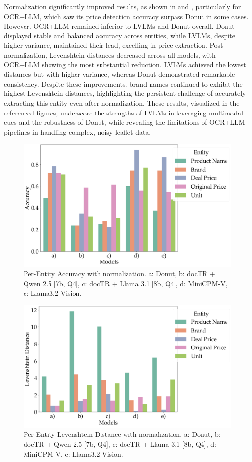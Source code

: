 \documentclass[11pt]{article}
\begin{document}
Normalization significantly improved results, as shown in  and , particularly for OCR+LLM, which saw its price detection accuracy surpass Donut in some cases. However, OCR+LLM remained inferior to LVLMs and Donut overall. Donut displayed stable and balanced accuracy across entities, while LVLMs, despite higher variance, maintained their lead, excelling in price extraction. Post-normalization, Levenshtein distances decreased across all models, with OCR+LLM showing the most substantial reduction. LVLMs achieved the lowest distances but with higher variance, whereas Donut demonstrated remarkable consistency. Despite these improvements, brand names continued to exhibit the highest Levenshtein distances, highlighting the persistent challenge of accurately extracting this entity even after normalization. These results, visualized in the referenced figures, underscore the strengths of LVLMs in leveraging multimodal cues and the robustness of Donut, while revealing the limitations of OCR+LLM pipelines in handling complex, noisy leaflet data.

\begin{figure}[h!]
    \centering
    \includegraphics[width=0.8\linewidth]{figures/accuracies_norm.png}
    \caption{Per-Entity Accuracy with normalization. a: Donut, b: docTR + Qwen 2.5 [7b, Q4], c: docTR + Llama 3.1 [8b, Q4], d: MiniCPM-V, e: Llama3.2-Vision.}
    \label{fig:eval_final_acc_norm}
\end{figure}

\begin{figure}[h!]
    \centering
    \includegraphics[width=0.8\linewidth]{figures/levdistances_norm.png}
    \caption{Per-Entity Levenshtein Distance with normalization. a: Donut, b: docTR + Qwen 2.5 [7b, Q4], c: docTR + Llama 3.1 [8b, Q4], d: MiniCPM-V, e: Llama3.2-Vision.}
    \label{fig:eval_final_levdis_norm}
\end{figure}
\end{document}
